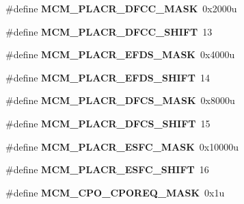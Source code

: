 \begin{DoxyCompactItemize}
\#define {\bfseries M\+C\+M\+\_\+\+P\+L\+A\+C\+R\+\_\+\+D\+F\+C\+C\+\_\+\+M\+A\+SK}~0x2000u
\item 
\mbox{\label{group___m_c_m___register___masks_ga43547ea594fc5be9183ff24f3bdcdee7}} 
\#define {\bfseries M\+C\+M\+\_\+\+P\+L\+A\+C\+R\+\_\+\+D\+F\+C\+C\+\_\+\+S\+H\+I\+FT}~13
\item 
\mbox{\label{group___m_c_m___register___masks_ga90eea584eb5978a2ddfee057cd2fec28}} 
\#define {\bfseries M\+C\+M\+\_\+\+P\+L\+A\+C\+R\+\_\+\+E\+F\+D\+S\+\_\+\+M\+A\+SK}~0x4000u
\item 
\mbox{\label{group___m_c_m___register___masks_gab4f3cedc3a9560ddb10ca0cddaab74dd}} 
\#define {\bfseries M\+C\+M\+\_\+\+P\+L\+A\+C\+R\+\_\+\+E\+F\+D\+S\+\_\+\+S\+H\+I\+FT}~14
\item 
\mbox{\label{group___m_c_m___register___masks_ga336a7d6634a1b5f72698ee41e1768d08}} 
\#define {\bfseries M\+C\+M\+\_\+\+P\+L\+A\+C\+R\+\_\+\+D\+F\+C\+S\+\_\+\+M\+A\+SK}~0x8000u
\item 
\mbox{\label{group___m_c_m___register___masks_gab9eab0c37b97341f1af2e72ec3c299e6}} 
\#define {\bfseries M\+C\+M\+\_\+\+P\+L\+A\+C\+R\+\_\+\+D\+F\+C\+S\+\_\+\+S\+H\+I\+FT}~15
\item 
\mbox{\label{group___m_c_m___register___masks_gadfd414b0c13cb1d199238e5a312a153d}} 
\#define {\bfseries M\+C\+M\+\_\+\+P\+L\+A\+C\+R\+\_\+\+E\+S\+F\+C\+\_\+\+M\+A\+SK}~0x10000u
\item 
\mbox{\label{group___m_c_m___register___masks_gae370a0400b2ce8cef0416ee11b9898f8}} 
\#define {\bfseries M\+C\+M\+\_\+\+P\+L\+A\+C\+R\+\_\+\+E\+S\+F\+C\+\_\+\+S\+H\+I\+FT}~16
\item 
\mbox{\label{group___m_c_m___register___masks_ga36f43d6467fbe16e5585829747471da9}} 
\#define {\bfseries M\+C\+M\+\_\+\+C\+P\+O\+\_\+\+C\+P\+O\+R\+E\+Q\+\_\+\+M\+A\+SK}~0x1u
\item 
\mbox{\label{group___m_c_m___register___masks_ga4787ad168d88290f8da659a6b30e243d}} 

\end{DoxyCompactItemize}
